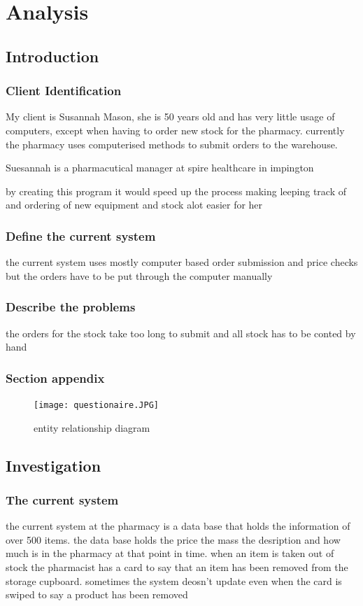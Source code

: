 \chapter{Analysis}

\section{Introduction}

\subsection{Client Identification}
My client is Susannah Mason, she is 50 years old and has very little usage of computers, except when having to order new stock for the pharmacy. currently the pharmacy uses computerised methods to submit orders to the warehouse.

Suesannah is a pharmacutical manager at spire healthcare in impington 

by  creating this program it would speed up the process making leeping track of and ordering of new equipment and stock alot easier for her 
\subsection{Define the current system}
 the current system uses mostly computer based order submission and price checks but the orders have to be put through the computer manually 
\subsection{Describe the problems}
the orders for the stock take too long to submit and all stock has to be conted by hand 
\subsection{Section appendix}
\begin{figure}[ht!]
\centering
\texttt{[image: questionaire.JPG]}
\caption{entity relationship diagram \label{overflow}}
\end{figure}
\section{Investigation}
\subsection{The current system}
the current system at the pharmacy is a data base that holds the information of over 500 items. the data base holds the price the mass the desription and how much is in the pharmacy at that point in time. when an item is taken out of stock the pharmacist has a card to say that an item has been removed from the storage cupboard. sometimes the system deosn't update even when the card is swiped to say a product has been removed
